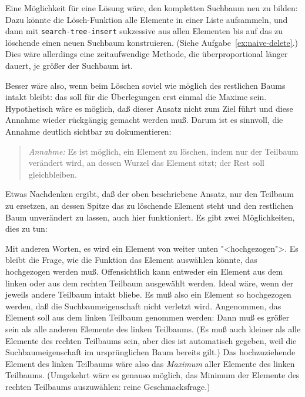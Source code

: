 Eine Möglichkeit für eine Lösung wäre, den kompletten Suchbaum neu zu
bilden: Dazu könnte die Lösch-Funktion alle Elemente in einer Liste
aufsammeln, und dann mit \texttt{search-tree-insert} sukzessive aus
allen Elementen bis auf das zu löschende einen neuen Suchbaum
konstruieren.  (Siehe Aufgabe~\ref{ex:naive-delete}.)  Dies wäre
allerdings eine zeitaufwendige Methode, die überproportional länger
dauert, je größer der Suchbaum ist.

Besser wäre also, wenn beim Löschen soviel wie möglich des restlichen
Baums intakt bleibt: das soll für die Überlegungen erst einmal die
Maxime sein.  Hypothetisch wäre es möglich, daß dieser Ansatz nicht
zum Ziel führt und diese Annahme wieder rückgängig gemacht werden
muß.  Darum ist es sinnvoll, die Annahme deutlich sichtbar
zu dokumentieren:

\begin{quote}
  \textit{Annahme:} Es ist möglich, ein Element zu löschen, indem nur
  der Teilbaum verändert wird, an dessen Wurzel das Element sitzt; der
  Rest soll gleichbleiben.
\end{quote}

Etwas Nachdenken ergibt, daß der oben beschriebene
Ansatz, nur den Teilbaum zu ersetzen, an dessen Spitze das zu
löschende Element steht und den restlichen Baum unverändert zu lassen,
auch hier funktioniert.  Es gibt zwei Möglichkeiten, dies zu tun:
%
\begin{pspdf}
\begin{center}
  {
    \Tdot
  }
  \qquad
  {
    \Tdot
  }
\end{center}
\end{pspdf}
% 
Mit anderen Worten, es wird ein Element von weiter unten
"<hochgezogen">.  Es bleibt die Frage, wie die Funktion das Element
auswählen könnte, das hochgezogen werden muß.  Offensichtlich kann
entweder ein Element aus dem linken oder aus dem rechten Teilbaum
ausgewählt werden.  Ideal wäre, wenn der jeweils andere Teilbaum
intakt bliebe.  Es muß also ein Element so hochgezogen werden, daß die
Suchbaumeigenschaft nicht verletzt wird.  Angenommen, das Element soll
aus dem linken Teilbaum genommen werden: Dann muß es größer sein als
alle anderen Elemente des linken Teilbaums.  (Es muß auch kleiner als
alle Elemente des rechten Teilbaums sein, aber dies ist automatisch
gegeben, weil die Suchbaumeigenschaft im ursprünglichen Baum bereits
gilt.)  Das hochzuziehende Element des linken Teilbaums wäre  also das
\emph{Maximum} aller Elemente des linken Teilbaums.  (Umgekehrt wäre
es genauso möglich, das Minimum der Elemente des rechten Teilbaums
auszuwählen: reine Geschmacksfrage.)

